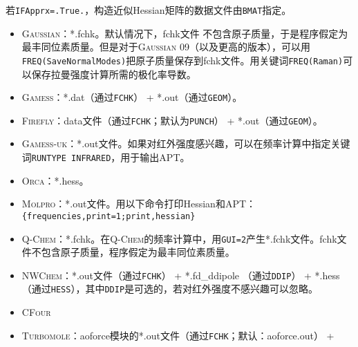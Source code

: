 \documentclass[12pt,a4paper,openany,twoside,cap,UTF8]{ctexbook}
\begin{document}
若\verb|IFApprx=.True.|，构造近似Hessian矩阵的数据文件由\verb|BMAT|指定。

\begin{itemize}
\item \textsc{Gaussian}：*.fchk。默认情况下，fchk文件 不包含原子质量，于是程序假定为最丰同位素质量。但是对于\textsc{Gaussian} 09（以及更高的版本），可以用\texttt{FREQ(SaveNormalModes)}把原子质量保存到fchk文件。用关键词\texttt{FREQ(Raman)}可以保存拉曼强度计算所需的极化率导数。
\item \textsc{Gamess}：*.dat（通过\verb|FCHK|） + *.out（通过\verb|GEOM|）。
\item \textsc{Firefly}：data文件（通过\verb|FCHK|；默认为\verb|PUNCH|） + *.out（通过\verb|GEOM|）。
\item \textsc{Gamess-uk}：*.out文件。如果对红外强度感兴趣，可以在频率计算中指定关键词\texttt{RUNTYPE INFRARED}，用于输出APT。
\item \textsc{Orca}：*.hess。
\item \textsc{Molpro}：*.out文件。用以下命令打印Hessian和APT： \\
\verb|{frequencies,print=1;print,hessian}|
\item \textsc{Q-Chem}：*.fchk。在\textsc{Q-Chem}的频率计算中，用\texttt{GUI=2}产生*.fchk文件。fchk文件不包含原子质量，程序假定为最丰同位素质量。
\item \textsc{NWChem}：*.out文件（通过\verb|FCHK|） + *.fd{\_}ddipole （通过\verb|DDIP|） +
*.hess （通过\verb|HESS|），其中\verb|DDIP|是可选的，若对红外强度不感兴趣可以忽略。
\item \textsc{CFour}
\item \textsc{Turbomole}：aoforce模块的*.out文件（通过\verb|FCHK|；默认：aoforce.out） +

\end{itemize}
\end{document}
